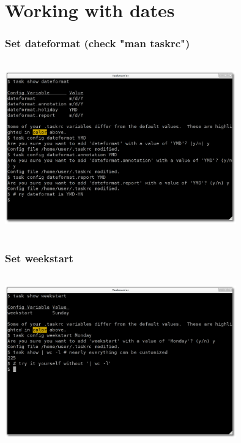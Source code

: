 \documentclass[t,handout]{beamer}
\begin{document}
\section{Working with dates}

\begin{frame}
\frametitle{Set dateformat (check "man taskrc")}
\begin{center}
\includegraphics[width=10cm,height=7.5cm]{set_dateformat.png}
\end{center}
\end{frame}

\begin{frame}
\frametitle{Set weekstart}
\begin{center}
\includegraphics[width=10cm,height=7.5cm]{set_weekstart.png}
\end{center}
\end{frame}
\end{document}
